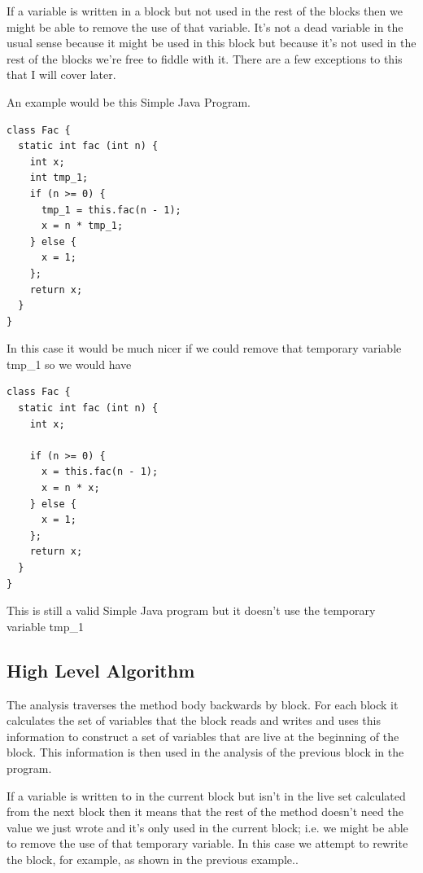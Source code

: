 \documentclass[11pt]{exam}
\begin{document}
If a variable is written in a block but not used in the rest of the
blocks then we might be able to remove the use of that variable. It's
not a dead variable in the usual sense because it might be used in
this block but because it's not used in the rest of the blocks we're
free to fiddle with it. There are a few exceptions to this that I will
cover later. \newline

An example would be this Simple Java Program. \newline

\begin{lstlisting}
class Fac {
  static int fac (int n) {
    int x;
    int tmp_1;
    if (n >= 0) {
      tmp_1 = this.fac(n - 1);
      x = n * tmp_1;
    } else {
      x = 1;
    };
    return x;
  }
}
\end{lstlisting}

In this case it would be much nicer if we could remove that temporary
variable tmp\_1 so we would have  \newline

\begin{lstlisting}
class Fac {
  static int fac (int n) {
    int x;

    if (n >= 0) {
      x = this.fac(n - 1);
      x = n * x;
    } else {
      x = 1;
    };
    return x;
  }
}
\end{lstlisting}

This is still a valid Simple Java program but it doesn't use the temporary
variable tmp\_1

\subsection{High Level Algorithm}

The analysis traverses the method body backwards by block. For each
block it calculates the set of variables that the block reads and
writes and uses this information to construct a set of variables that
are live at the beginning of the block. This information is then used
in the analysis of the previous block in the program. \newline

If a variable is written to in the current block but isn't in the live
set calculated from the next block then it means that the rest of the
method doesn't need the value we just wrote and it's only used in the
current block; i.e. we might be able to remove the use of that
temporary variable. In this case we attempt to rewrite the block, for
example, as shown in the previous example.. \newline
\end{document}
